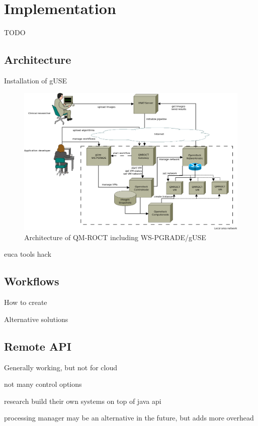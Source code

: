 \section{Implementation}\label{implementation}

TODO

\subsection{Architecture}\label{architecture}

Installation of gUSE

\begin{figure}%
                \centering
                \includegraphics[width=2.0\columnwidth]{images/somno-architecture.png}
                \caption{Architecture of QM-ROCT \cite{wu14} including WS-PGRADE/gUSE}
                \label{fig:architecture}
\end{figure}

euca tools hack

\subsection{Workflows}\label{workflowimplementation}

How to create

Alternative solutions

\subsection{Remote API}\label{api}

Generally working, but not for cloud

not many control options

research build their own systems on top of java api

processing manager may be an alternative in the future, but adds more overhead